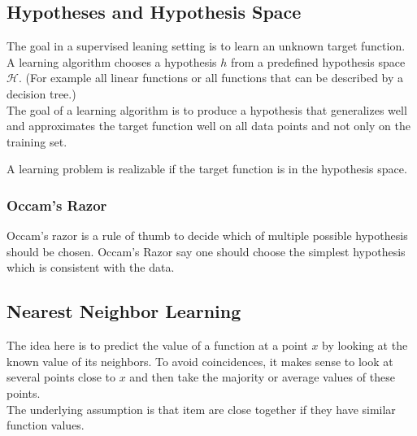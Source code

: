 \documentclass{panikzettel}
\begin{document}
\subsection{Hypotheses and Hypothesis Space}
The goal in a supervised leaning setting is to learn an unknown target function. A learning algorithm chooses a hypothesis $h$ from a predefined hypothesis space $\mathcal{H}$. (For example all linear functions or all functions that can be described by a decision tree.)\\
The goal of a learning algorithm is to produce a hypothesis that generalizes well and approximates the target function well on all data points and not only on the training set.

A learning problem is realizable if the target function is in the hypothesis space.


\subsubsection{Occam's Razor}
Occam's razor is a rule of thumb to decide which of multiple possible hypothesis should be chosen. Occam's Razor say one should choose the simplest hypothesis which is consistent with the data.


\subsection{Nearest Neighbor Learning}
The idea here is to predict the value of a function at a point $x$ by looking at the known value of its neighbors. To avoid coincidences, it makes sense to look at several points close to $x$ and then take the majority or average values of these points.\\
The underlying assumption is that item are close together if they have similar function values.
\end{document}
